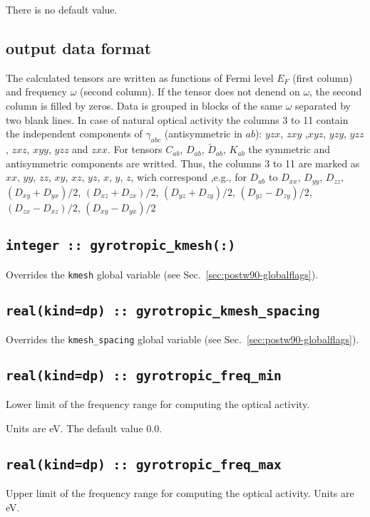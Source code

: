 There is no default value.

\subsection{output data format \label{sec:gyrotropic:format}}
The calculated tensors are written as functions of Fermi level $E_F$ (first column) 
and frequency $\omega$ (second column).
If the tensor does not denend on $\omega$, the second column is filled by zeros. 
Data is grouped in blocks of the same $\omega$ separated by two blank lines.
In case of natural optical activity the columns 3 to 11 contain the independent 
components of $\gamma_{abc}$ (antisymmetric in $ab$): $yzx$, $zxy$ ,$xyz$, $yzy$, $yzz$, $zxz$, $xyy$, $yzz$ and $zxx$.
For tensors $C_{ab}$, $D_{ab}$, $\widetilde D_{ab}$, $K_{ab}$ the symmetric and antisymmetric components are writted.
Thus, the columns 3 to 11 are marked as $xx$, $yy$, $zz$, $xy$, $xz$, $yz$, $x$, $y$, $z$, wich correspond ,e.g., for $D_{ab}$ to 
$D_{xx}$, $D_{yy}$, $D_{zz}$, $(D_{xy}+D_{yx})/2$, $(D_{xz}+D_{zx})/2$, $(D_{yz}+D_{zy})/2$, $(D_{yz}-D_{zy})/2$, $(D_{zx}-D_{xz})/2$, $(D_{xy}-D_{yx})/2$

\subsection[gyrotropic\_kmesh]{\tt integer :: gyrotropic\_kmesh(:)}
Overrides the \verb#kmesh# global variable (see
Sec.~\ref{sec:postw90-globalflags}).

\subsection[gyrotropic\_kmesh\_spacing]{\tt real(kind=dp) ::
  gyrotropic\_kmesh\_spacing}
Overrides the \verb#kmesh_spacing# global variable (see
Sec.~\ref{sec:postw90-globalflags}).


\subsection[gyrotropic\_freq\_min]{\tt real(kind=dp) :: gyrotropic\_freq\_min}
Lower limit of the frequency range for computing the optical activity. 

Units are eV.
The default value 0.0.

\subsection[gyrotropic\_freq\_max]{\tt real(kind=dp) :: gyrotropic\_freq\_max}
Upper limit of the frequency range for computing the optical activity. Units are eV.

